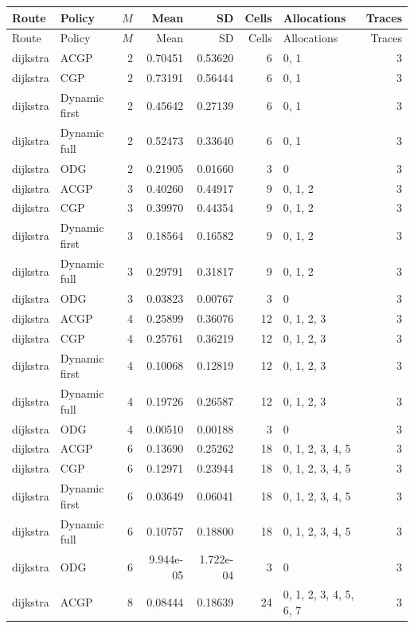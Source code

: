 \documentclass[10pt,a4paper]{article}
\begin{document}
\tiny\setlength{\tabcolsep}{2pt}\begin{longtable}{@{}p{23mm}p{29mm}rrrrp{36mm}r@{}}
\toprule Route & Policy & $M$ & Mean & SD & Cells & Allocations & Traces \\ \midrule\endfirsthead
\toprule Route & Policy & $M$ & Mean & SD & Cells & Allocations & Traces \\ \midrule\endhead
\bottomrule\endfoot
dijkstra & ACGP & 2 & 0.70451 & 0.53620 & 6 & 0, 1 & 3 \\
dijkstra & CGP & 2 & 0.73191 & 0.56444 & 6 & 0, 1 & 3 \\
dijkstra & Dynamic first & 2 & 0.45642 & 0.27139 & 6 & 0, 1 & 3 \\
dijkstra & Dynamic full & 2 & 0.52473 & 0.33640 & 6 & 0, 1 & 3 \\
dijkstra & ODG & 2 & 0.21905 & 0.01660 & 3 & 0 & 3 \\
dijkstra & ACGP & 3 & 0.40260 & 0.44917 & 9 & 0, 1, 2 & 3 \\
dijkstra & CGP & 3 & 0.39970 & 0.44354 & 9 & 0, 1, 2 & 3 \\
dijkstra & Dynamic first & 3 & 0.18564 & 0.16582 & 9 & 0, 1, 2 & 3 \\
dijkstra & Dynamic full & 3 & 0.29791 & 0.31817 & 9 & 0, 1, 2 & 3 \\
dijkstra & ODG & 3 & 0.03823 & 0.00767 & 3 & 0 & 3 \\
dijkstra & ACGP & 4 & 0.25899 & 0.36076 & 12 & 0, 1, 2, 3 & 3 \\
dijkstra & CGP & 4 & 0.25761 & 0.36219 & 12 & 0, 1, 2, 3 & 3 \\
dijkstra & Dynamic first & 4 & 0.10068 & 0.12819 & 12 & 0, 1, 2, 3 & 3 \\
dijkstra & Dynamic full & 4 & 0.19726 & 0.26587 & 12 & 0, 1, 2, 3 & 3 \\
dijkstra & ODG & 4 & 0.00510 & 0.00188 & 3 & 0 & 3 \\
dijkstra & ACGP & 6 & 0.13690 & 0.25262 & 18 & 0, 1, 2, 3, 4, 5 & 3 \\
dijkstra & CGP & 6 & 0.12971 & 0.23944 & 18 & 0, 1, 2, 3, 4, 5 & 3 \\
dijkstra & Dynamic first & 6 & 0.03649 & 0.06041 & 18 & 0, 1, 2, 3, 4, 5 & 3 \\
dijkstra & Dynamic full & 6 & 0.10757 & 0.18800 & 18 & 0, 1, 2, 3, 4, 5 & 3 \\
dijkstra & ODG & 6 & 9.944e-05 & 1.722e-04 & 3 & 0 & 3 \\
dijkstra & ACGP & 8 & 0.08444 & 0.18639 & 24 & 0, 1, 2, 3, 4, 5, 6, 7 & 3 \\

\end{longtable}
\end{document}
